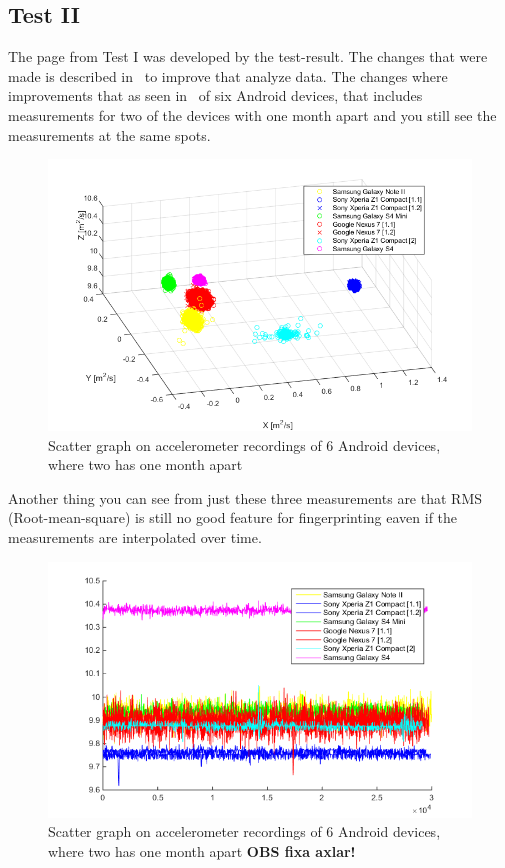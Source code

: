 \subsection{Test II}
The page from Test I was developed by the test-result. The changes that were made is described in~ to improve that analyze data. The changes where improvements that as seen in~ of six Android devices, that includes measurements for two of the devices with one month apart and you still see the measurements at the same spots.
\begin{figure}[H]
	\centering
	\includegraphics[scale=.7]{img/oneMonth-scatter}
	\caption{Scatter graph on accelerometer recordings of 6 Android devices, where two has one month apart}
	\label{fig:scatter1m}
\end{figure}
Another thing you can see from just these three measurements are that RMS (Root-mean-square) is still no good feature for fingerprinting eaven if the measurements are interpolated over time.
\begin{figure}[H]
	\centering
	\includegraphics[scale=.7]{img/oneMonth-plot-RMS}
	\caption{Scatter graph on accelerometer recordings of 6 Android devices, where two has one month apart \textbf{OBS fixa axlar!}}
	\label{fig:plot1mRMS}
\end{figure}

